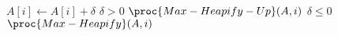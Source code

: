 \begin{codebox}
\li $A[i] \gets A[i] + \delta$
\li \If $\delta > 0$
\li \Then
        $\proc{Max-Heapify-Up}(A,i)$
\li \Else
    	\Comment $\delta \leq 0$
\li    	$\proc{Max-Heapify}(A,i)$
    \End
\end{codebox}